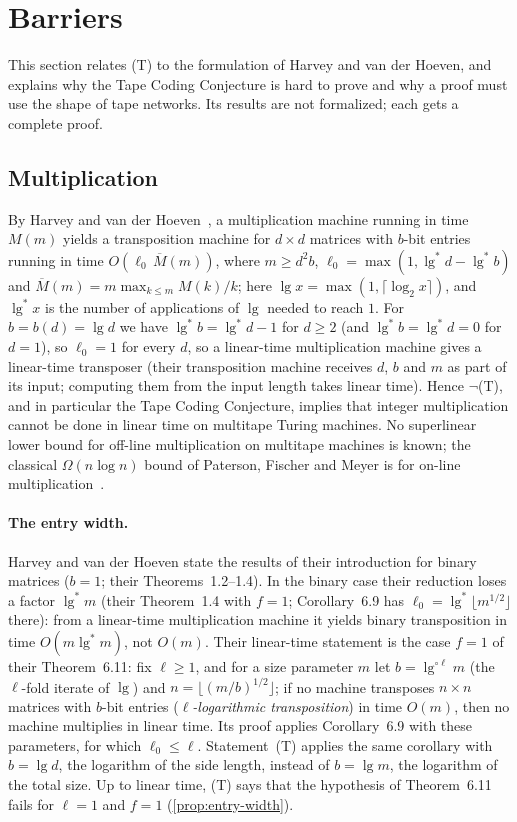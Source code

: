 \section{Barriers}\label{sec:barriers}

This section relates (T) to the formulation of Harvey and van der Hoeven, and explains why the Tape Coding Conjecture is hard to prove and why a proof must use the shape of tape networks. Its results are not formalized; each gets a complete proof.

\subsection{Multiplication}\label{sec:multiplication}

By Harvey and van der Hoeven~\cite[Cor.~6.9]{HvdH2025}, a multiplication machine running in time
$M(m)$ yields a transposition machine for $d\times d$ matrices with $b$-bit entries running in time
$O(\ell_0\,\overline M(m))$, where $m\ge d^2b$, $\ell_0=\max(1,\lg^*d-\lg^*b)$ and
$\overline M(m)=m\max_{k\le m}M(k)/k$; here $\lg x=\max(1,\lceil\log_2x\rceil)$, and $\lg^*x$ is the number of applications of $\lg$ needed to reach $1$. For $b=b(d)=\lg d$ we have $\lg^*b=\lg^*d-1$ for $d\ge2$ (and $\lg^*b=\lg^*d=0$ for $d=1$), so $\ell_0=1$ for every $d$, so a linear-time multiplication machine gives a linear-time transposer (their transposition machine receives $d$, $b$ and $m$ as part of its input; computing them from the input length takes linear time). Hence $\neg$(T), and in particular
the Tape Coding Conjecture, implies that integer multiplication cannot be done in linear time on
multitape Turing machines. No superlinear lower bound for off-line multiplication on multitape
machines is known; the classical $\Omega(n\log n)$ bound of Paterson, Fischer and Meyer is for
on-line multiplication~\cite{PFM1974}.

\paragraph{The entry width.} Harvey and van der Hoeven state the results of their introduction for binary matrices ($b=1$; their Theorems~1.2--1.4). In the binary case their reduction loses a factor $\lg^*m$ (their Theorem~1.4 with $f=1$; Corollary~6.9 has $\ell_0=\lg^*\lfloor m^{1/2}\rfloor$ there): from a linear-time multiplication machine it yields binary transposition in time $O(m\lg^*m)$, not $O(m)$. Their linear-time statement is the case $f=1$ of their Theorem~6.11: fix $\ell\ge1$, and for a size parameter $m$ let $b=\lg^{\circ\ell}m$ (the $\ell$-fold iterate of $\lg$) and $n=\lfloor(m/b)^{1/2}\rfloor$; if no machine transposes $n\times n$ matrices with $b$-bit entries (\emph{$\ell$-logarithmic transposition}) in time $O(m)$, then no machine multiplies in linear time. Its proof applies Corollary~6.9 with these parameters, for which $\ell_0\le\ell$. Statement~(T) applies the same corollary
with $b=\lg d$, the logarithm of the side length, instead of $b=\lg m$, the logarithm of the total size. Up to linear time, (T) says that the hypothesis of Theorem~6.11 fails for $\ell=1$ and $f=1$ (\cref{prop:entry-width}).

